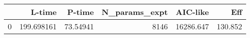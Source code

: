 \begin{tabular}{lrrrrr}
\toprule
{} &      L-time &    P-time &  N\_params\_expt &   AIC-like &      Eff \\
\midrule
0 &  199.698161 &  73.54941 &           8146 &  16286.647 &  130.852 \\
\bottomrule
\end{tabular}
